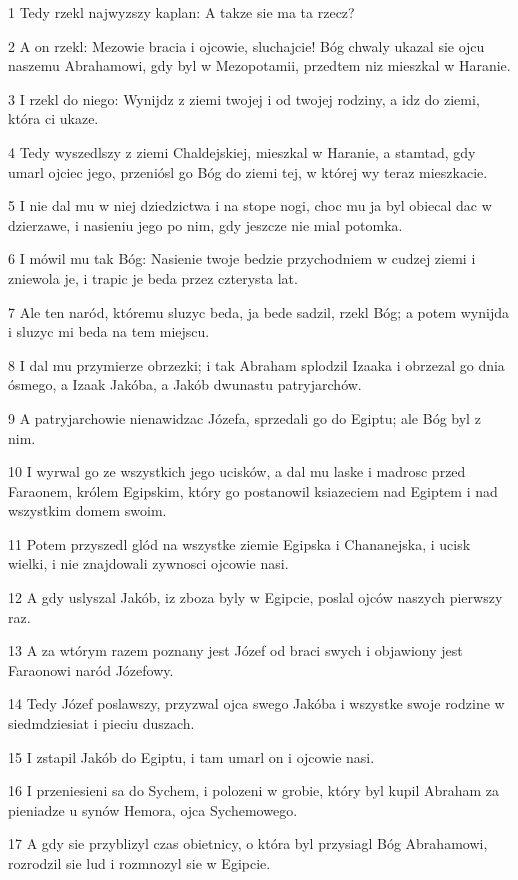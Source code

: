 \par 1 Tedy rzekl najwyzszy kaplan: A takze sie ma ta rzecz?
\par 2 A on rzekl: Mezowie bracia i ojcowie, sluchajcie! Bóg chwaly ukazal sie ojcu naszemu Abrahamowi, gdy byl w Mezopotamii, przedtem niz mieszkal w Haranie.
\par 3 I rzekl do niego: Wynijdz z ziemi twojej i od twojej rodziny, a idz do ziemi, która ci ukaze.
\par 4 Tedy wyszedlszy z ziemi Chaldejskiej, mieszkal w Haranie, a stamtad, gdy umarl ojciec jego, przeniósl go Bóg do ziemi tej, w której wy teraz mieszkacie.
\par 5 I nie dal mu w niej dziedzictwa i na stope nogi, choc mu ja byl obiecal dac w dzierzawe, i nasieniu jego po nim, gdy jeszcze nie mial potomka.
\par 6 I mówil mu tak Bóg: Nasienie twoje bedzie przychodniem w cudzej ziemi i zniewola je, i trapic je beda przez czterysta lat.
\par 7 Ale ten naród, któremu sluzyc beda, ja bede sadzil, rzekl Bóg; a potem wynijda i sluzyc mi beda na tem miejscu.
\par 8 I dal mu przymierze obrzezki; i tak Abraham splodzil Izaaka i obrzezal go dnia ósmego, a Izaak Jakóba, a Jakób dwunastu patryjarchów.
\par 9 A patryjarchowie nienawidzac Józefa, sprzedali go do Egiptu; ale Bóg byl z nim.
\par 10 I wyrwal go ze wszystkich jego ucisków, a dal mu laske i madrosc przed Faraonem, królem Egipskim, który go postanowil ksiazeciem nad Egiptem i nad wszystkim domem swoim.
\par 11 Potem przyszedl glód na wszystke ziemie Egipska i Chananejska, i ucisk wielki, i nie znajdowali zywnosci ojcowie nasi.
\par 12 A gdy uslyszal Jakób, iz zboza byly w Egipcie, poslal ojców naszych pierwszy raz.
\par 13 A za wtórym razem poznany jest Józef od braci swych i objawiony jest Faraonowi naród Józefowy.
\par 14 Tedy Józef poslawszy, przyzwal ojca swego Jakóba i wszystke swoje rodzine w siedmdziesiat i pieciu duszach.
\par 15 I zstapil Jakób do Egiptu, i tam umarl on i ojcowie nasi.
\par 16 I przeniesieni sa do Sychem, i polozeni w grobie, który byl kupil Abraham za pieniadze u synów Hemora, ojca Sychemowego.
\par 17 A gdy sie przyblizyl czas obietnicy, o która byl przysiagl Bóg Abrahamowi, rozrodzil sie lud i rozmnozyl sie w Egipcie.
